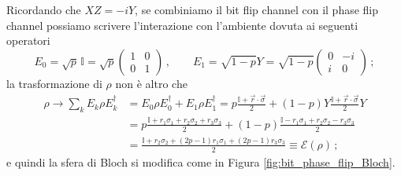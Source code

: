 \begin{esempio}
    Ricordando che $XZ = -i Y$, se combiniamo il bit flip channel con il phase flip channel possiamo scrivere l'interazione con l'ambiente dovuta ai seguenti operatori
    \begin{equation*}
        E_0 = \sqrt{p} \, \mathbb{I} = \sqrt{p}
        \begin{pmatrix}
            1 & 0 \\ 0 & 1
        \end{pmatrix} \, , \qquad
        E_1 = \sqrt{1-p} Y = \sqrt{1-p}
        \begin{pmatrix}
            0 & -i \\ i & 0
        \end{pmatrix} \, ;
    \end{equation*}
    la trasformazione di $\rho$ non è altro che
    \begin{align*}
        \rho \rightarrow \sum_k E_k \rho E_k^\dag &= E_0 \rho E_0^\dag + E_1 \rho E_1^\dag = p \frac{\mathbb{I} + \vec{r} \cdot \vec{\sigma}}{2} + (1-p) Y \frac{\mathbb{I} + \vec{r} \cdot \vec{\sigma}}{2} Y \\
        &= p \frac{\mathbb{I} + r_1 \sigma_1 + r_2 \sigma_2 + r_3 \sigma_3}{2} + (1-p) \frac{\mathbb{I} - r_1 \sigma_1 + r_2 \sigma_2 - r_3 \sigma_3}{2} \\
        &= \frac{\mathbb{I} + r_2 \sigma_2 + (2p-1) r_1 \sigma_1 + (2p-1) r_3 \sigma_3}{2} \equiv \mathcal{E}(\rho) \, ;
    \end{align*}
    e quindi la sfera di Bloch si modifica come in Figura \ref{fig:bit_phase_flip_Bloch}. 
    \begin{figure}[!ht]
	\centering	
	 \quad

\end{figure}
\end{esempio}
